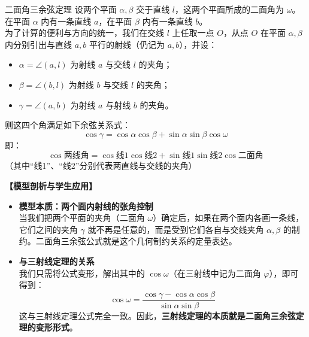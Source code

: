 \documentclass[11pt,a4paper]{ctexart}
\begin{document}
\begin{theorembox}{二面角三余弦定理}
设两个平面 $\alpha, \beta$ 交于直线 $l$，这两个平面所成的二面角为 $\omega$。在平面 $\alpha$ 内有一条直线 $a$，在平面 $\beta$ 内有一条直线 $b$。\\
为了计算的便利与方向的统一，我们在交线 $l$ 上任取一点 $O$，从点 $O$ 在平面 $\alpha, \beta$ 内分别引出与直线 $a, b$ 平行的射线（仍记为 $a, b$），并设：
\begin{itemize}
    \item $\alpha = \angle(a, l)$ 为射线 $a$ 与交线 $l$ 的夹角；
    \item $\beta = \angle(b, l)$ 为射线 $b$ 与交线 $l$ 的夹角；
    \item $\gamma = \angle(a, b)$ 为射线 $a$ 与射线 $b$ 的夹角。
\end{itemize}
则这四个角满足如下余弦关系式：
\[ \cos\gamma = \cos\alpha \cos\beta + \sin\alpha \sin\beta \cos\omega \]
即：
\[ \cos\text{两线角} = \cos\text{线1} \cos\text{线2} + \sin\text{线1} \sin\text{线2} \cos\text{二面角} \]
（其中“线1”、“线2”分别代表两直线与交线的夹角）
\end{theorembox}

\noindent\textbf{【模型剖析与学生应用】}
\begin{itemize}
    \item \textbf{模型本质：两个面内射线的张角控制} \\
    当我们把两个平面的夹角（二面角 $\omega$）确定后，如果在两个面内各画一条线，它们之间的夹角 $\gamma$ 就不再是任意的，而是受到它们各自与交线夹角 $\alpha, \beta$ 的制约。二面角三余弦公式就是这个几何制约关系的定量表达。
    \item \textbf{与三射线定理的关系} \\
    我们只需将公式变形，解出其中的 $\cos\omega$（在三射线中记为二面角 $\varphi$），即可得到：
    \[ \cos\omega = \frac{\cos\gamma - \cos\alpha \cos\beta}{\sin\alpha \sin\beta} \]
    这与三射线定理公式完全一致。因此，\textbf{三射线定理的本质就是二面角三余弦定理的变形形式}。
\end{itemize}
\end{document}
